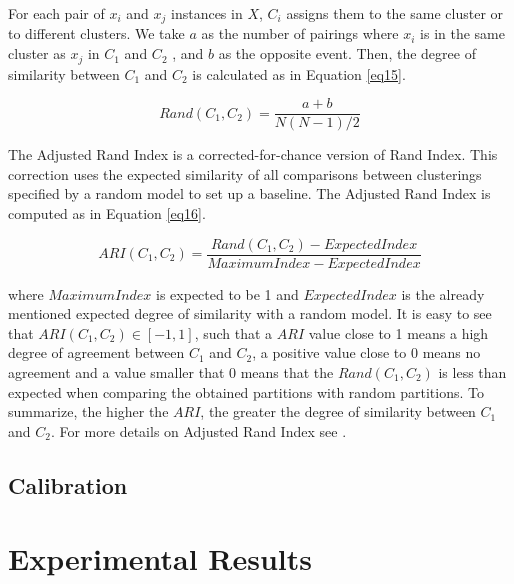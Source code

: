 \documentclass[review]{elsarticle}
\begin{document}
For each pair of $x_i$ and $x_j$ instances in $X$, $C_i$ assigns them to the same cluster or to different clusters. We take $a$ as the number of pairings where $x_i$ is in the same cluster as $x_j$ in $C_1$ and $C_2$ , and $b$ as the opposite event. Then, the degree of similarity between $C_1$ and $C_2$ is calculated as in Equation \eqref{eq15}.

\begin{equation}
Rand(C_1, C_2) = \frac{a + b}{N(N - 1)/2}
\label{eq15}
\end{equation}

The Adjusted Rand Index is a corrected-for-chance version of Rand Index. This correction uses the expected similarity of all comparisons between clusterings specified by a random model to set up a baseline. The Adjusted Rand Index is computed as in Equation \eqref{eq16}.

\begin{equation}
ARI(C_1, C_2) = \frac{Rand(C_1, C_2) - ExpectedIndex}{MaximumIndex - ExpectedIndex}
\label{eq16}
\end{equation}

where $MaximumIndex$ is expected to be 1 and $ExpectedIndex$ is the already mentioned expected degree of similarity with a random model. It is easy to see that $ARI(C_1, C_2) \in [-1,1]$, such that a $ARI$ value close to 1 means a high degree of agreement between $C_1$ and $C_2$, a positive value close to 0 means no agreement and a value smaller that 0 means that the $Rand(C_1, C_2)$ is less than expected when comparing the obtained partitions with random partitions. To summarize, the higher the $ARI$, the greater the degree of similarity between $C_1$ and $C_2$. For more details on Adjusted Rand Index see \cite{hubert1985comparing}.


\subsection{Calibration}

\clearpage

\section{Experimental Results}
\end{document}
